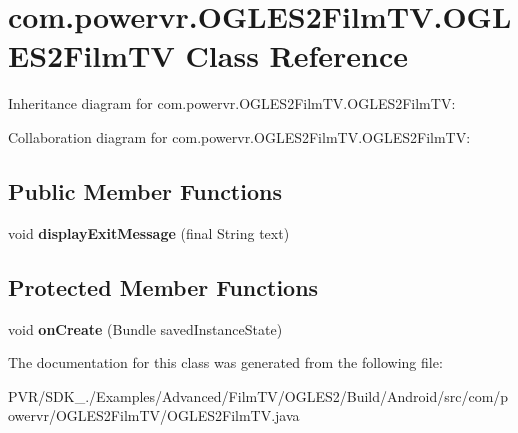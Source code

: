 \hypertarget{classcom_1_1powervr_1_1_o_g_l_e_s2_film_t_v_1_1_o_g_l_e_s2_film_t_v}{\section{com.\+powervr.\+O\+G\+L\+E\+S2\+Film\+T\+V.\+O\+G\+L\+E\+S2\+Film\+T\+V Class Reference}
\label{classcom_1_1powervr_1_1_o_g_l_e_s2_film_t_v_1_1_o_g_l_e_s2_film_t_v}
}


Inheritance diagram for com.\+powervr.\+O\+G\+L\+E\+S2\+Film\+T\+V.\+O\+G\+L\+E\+S2\+Film\+T\+V\+:


Collaboration diagram for com.\+powervr.\+O\+G\+L\+E\+S2\+Film\+T\+V.\+O\+G\+L\+E\+S2\+Film\+T\+V\+:
\subsection*{Public Member Functions}
\begin{DoxyCompactItemize}
\item 
\hypertarget{classcom_1_1powervr_1_1_o_g_l_e_s2_film_t_v_1_1_o_g_l_e_s2_film_t_v_a3c6140f9b6f6181a79bb8be4740e3bb4}{void {\bfseries display\+Exit\+Message} (final String text)}\label{classcom_1_1powervr_1_1_o_g_l_e_s2_film_t_v_1_1_o_g_l_e_s2_film_t_v_a3c6140f9b6f6181a79bb8be4740e3bb4}

\end{DoxyCompactItemize}
\subsection*{Protected Member Functions}
\begin{DoxyCompactItemize}
\item 
\hypertarget{classcom_1_1powervr_1_1_o_g_l_e_s2_film_t_v_1_1_o_g_l_e_s2_film_t_v_af3a7bbbbb7fc818d4fd57d2041e4be33}{void {\bfseries on\+Create} (Bundle saved\+Instance\+State)}\label{classcom_1_1powervr_1_1_o_g_l_e_s2_film_t_v_1_1_o_g_l_e_s2_film_t_v_af3a7bbbbb7fc818d4fd57d2041e4be33}

\end{DoxyCompactItemize}


The documentation for this class was generated from the following file\+:\begin{DoxyCompactItemize}
\item 
P\+V\+R/\+S\+D\+K\+\_./\+Examples/\+Advanced/\+Film\+T\+V/\+O\+G\+L\+E\+S2/\+Build/\+Android/src/com/powervr/\+O\+G\+L\+E\+S2\+Film\+T\+V/O\+G\+L\+E\+S2\+Film\+T\+V.\+java\end{DoxyCompactItemize}
